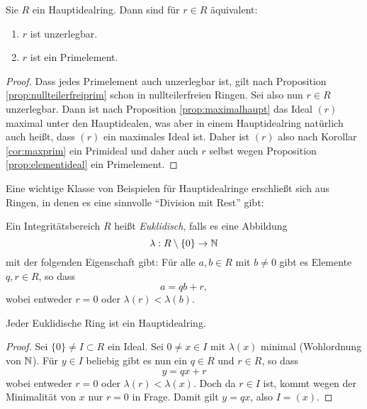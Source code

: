 \documentclass{book}
\begin{document}
\begin{prop}
    \label{prop:hauptirred}
    Sie $R$ ein Hauptidealring. Dann sind für $r \in R$ äquivalent:
    \begin{enumerate}[label=(\roman *)]
        \item $r$ ist unzerlegbar. 
        \item $r$ ist ein Primelement. 
    \end{enumerate}
\end{prop}
\begin{proof}
    Dass jedes Primelement auch unzerlegbar ist, gilt nach Proposition
    \ref{prop:nullteilerfreiprim} schon in nullteilerfreien Ringen. Sei also
    nun $r \in R$ unzerlegbar. Dann ist nach Proposition
    \ref{prop:maximalhaupt} das Ideal $(r)$ maximal unter den Hauptidealen, was
    aber in einem Hauptidealring natürlich auch heißt, dass $(r)$ ein maximales
    Ideal ist. Daher ist $(r)$ also nach Korollar \ref{cor:maxprim} ein
    Primideal und daher auch $r$ selbst wegen Proposition
    \ref{prop:elementideal} ein Primelement.
\end{proof}

Eine wichtige Klasse von Beispielen für Hauptidealringe erschließt sich aus
Ringen, in denen es eine sinnvolle ``Division mit Rest'' gibt:

\begin{defi}
    \label{defi:euklid}
    Ein Integritätsbereich $R$ heißt \emph{Euklidisch}, falls es eine Abbildung 
    \[
        \lambda: R \setminus \{0\} \to \mathbb{N}
    \] 
    mit der folgenden Eigenschaft gibt: Für alle $a,b \in R$ mit $b \neq 0$
    gibt es Elemente $q,r \in R$, so dass
    \[
        a = qb + r,
    \]
    wobei entweder $r = 0$ oder $\lambda(r) < \lambda(b)$. 
\end{defi}

\begin{thm}
    \label{thm:euklidhaupt}
    Jeder Euklidische Ring ist ein Hauptidealring.
\end{thm}
\begin{proof}
    Sei $\{0\} \neq I \subset R$ ein Ideal. Sei $0 \neq x \in I$ mit $\lambda(x)$ minimal
    (Wohlordnung von $\mathbb{N}$). Für $y \in I$ beliebig gibt es nun ein $q \in R$ und $r \in R$, so dass
    \[
        y = qx + r
    \]
    wobei entweder $r = 0$ oder $\lambda(r) < \lambda(x)$. Doch da $r \in I$ ist,
    kommt wegen der Minimalität von $x$ nur $r=0$ in Frage. Damit gilt $y
    = qx$, also $I = (x)$. 
\end{proof}
\end{document}
